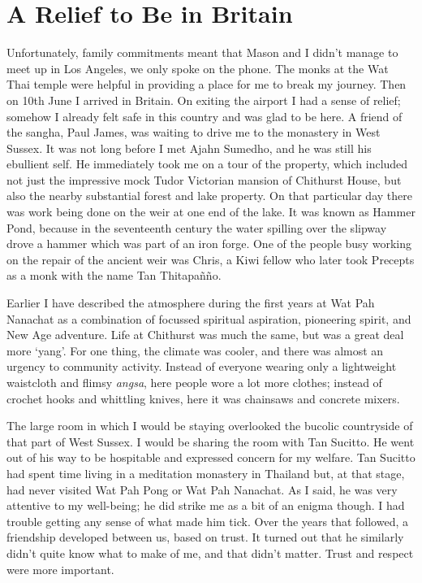 \chapter{A Relief to Be in Britain}

Unfortunately, family commitments meant that Mason and I didn't manage
to meet up in Los Angeles, we only spoke on the phone. The monks at the
Wat Thai temple were helpful in providing a place for me to break my
journey. Then on 10th June I arrived in Britain. On exiting the airport
I had a sense of relief; somehow I already felt safe in this country and
was glad to be here. A friend of the sangha, Paul James, was waiting to
drive me to the monastery in West Sussex. It was not long before I met
Ajahn Sumedho, and he was still his ebullient self. He immediately took
me on a tour of the property, which included not just the impressive mock Tudor
Victorian mansion of Chithurst House\cite{cbm-house},
but also the nearby substantial forest and lake
property. On that particular day there was work being done on the weir
at one end of the lake. It was known as Hammer Pond, because in the
seventeenth century the water spilling over the slipway drove a hammer
which was part of an iron forge. One of the people busy working on the
repair of the ancient weir was Chris, a Kiwi fellow who later took
Precepts as a monk with the name Tan Thitapañño.

Earlier I have described the atmosphere during the first years at Wat
Pah Nanachat as a combination of focussed spiritual aspiration,
pioneering spirit, and New Age adventure. Life at Chithurst was much the
same, but was a great deal more `yang'. For one thing, the climate was
cooler, and there was almost an urgency to community activity. Instead
of everyone wearing only a lightweight waistcloth and flimsy
\emph{angsa}, here people wore a lot more clothes; instead of crochet
hooks and whittling knives, here it was chainsaws and concrete mixers.

The large room in which I would be staying overlooked the bucolic
countryside of that part of West Sussex. I would be sharing the room
with Tan Sucitto. He went out of his way to be hospitable and expressed
concern for my welfare. Tan Sucitto had spent time living in a
meditation monastery in Thailand but, at that stage, had never visited
Wat Pah Pong or Wat Pah Nanachat. As I said, he was very attentive to my
well-being; he did strike me as a bit of an enigma though. I had trouble
getting any sense of what made him tick. Over the years that followed, a
friendship developed between us, based on trust. It turned out that he
similarly didn't quite know what to make of me, and that didn't matter.
Trust and respect were more important.

